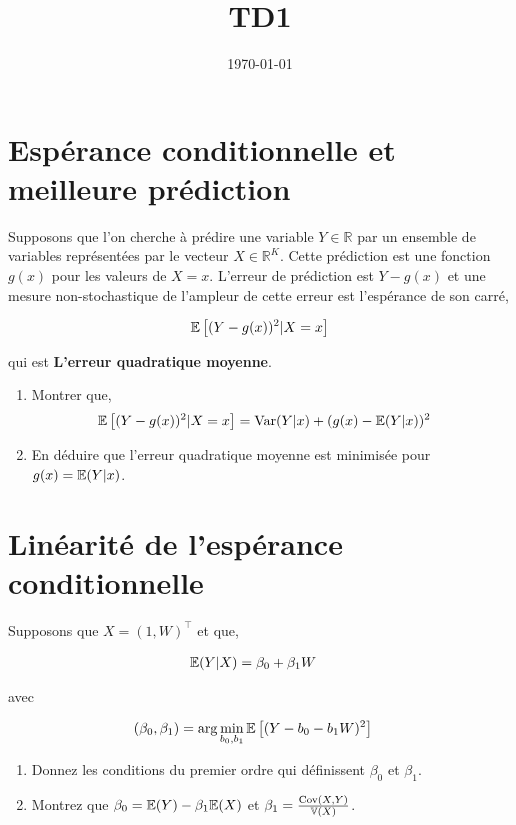 
\title{TD1}
\date{\today}

\maketitle
\section{Espérance conditionnelle et meilleure prédiction}
Supposons que l'on cherche à prédire une variable $Y\in \mathbb{R}$
par un ensemble de variables représentées par le vecteur
$X\in\mathbb{R}^K$. Cette prédiction est une fonction $g(x)$ pour les
valeurs de $X=x$. L'erreur de prédiction est $Y-g(x)$ et une mesure
non-stochastique de l'ampleur de cette erreur est l'espérance de son
carré,

\begin{align*}
\mathbb{E}\left[(Y-g(x))^2 | X = x\right]
\end{align*}

qui est \textbf{L'erreur quadratique moyenne}. 
\begin{enumerate}
\item Montrer que,
\begin{align*}
\mathbb{E}\left[(Y-g(x))^2 | X = x\right] &= \mathrm{Var}(Y|x) +  (g(x) - \mathbb{E}(Y|x))^2
\end{align*}
\item En déduire que l'erreur quadratique moyenne est minimisée pour
  $g(x) = \mathbb{E}(Y|x)$.
\end{enumerate}

\section{Linéarité de l'espérance conditionnelle}
Supposons que $X=(1, W)^\top$ et que,

\begin{align*}
\mathbb{E}(Y| X)  &= \beta_0 + \beta_1 W
\end{align*}

avec 

\begin{align*}
(\beta_0, \beta_1) &= \arg\min_{b_0, b_1}\mathbb{E}\left[(Y - b_0 - b_1W)^2\right]
\end{align*}


\begin{enumerate}
\item Donnez les conditions du premier ordre qui définissent $\beta_0$
  et $\beta_1$.
\item Montrez que $\beta_0 = \mathbb{E}(Y)-\beta_1\mathbb{E}(X)$ et $\beta_1 =
  \frac{\mathrm{Cov}(X, Y)}{\mathbb{V}(X)}$.
\end{enumerate}

